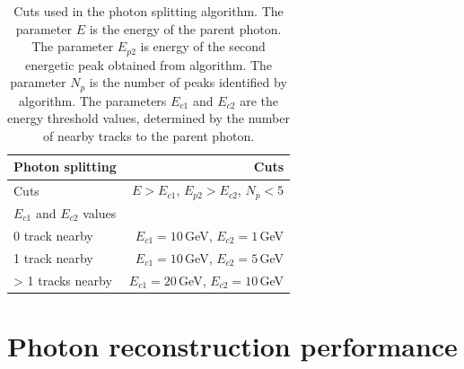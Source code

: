 \begin{table}[htbp]
\centering
\smallskip
\begin{tabular}{l r }
\hline
\hline
Photon splitting&  Cuts\\
\hline
\multicolumn{1}{L{0.3\textwidth}}{Cuts} & \multicolumn{1}{R{0.6\textwidth}}{$E > E_{c1}$, $E_{p2} > E_{c2}$, $N_{p} < 5$} \\
\hline
$E_{c1}$ and $E_{c2}$ values &  \\
\hline
\multicolumn{1}{L{0.3\textwidth}}{0 track nearby} & \multicolumn{1}{R{0.6\textwidth}}{$E_{c1} = 10$\,GeV, $E_{c2} = 1$\,GeV} \\
\multicolumn{1}{L{0.3\textwidth}}{1 track nearby} & \multicolumn{1}{R{0.6\textwidth}}{$E_{c1} = 10$\,GeV, $E_{c2} = 5$\,GeV} \\
\multicolumn{1}{L{0.3\textwidth}}{> 1 tracks nearby} & \multicolumn{1}{R{0.6\textwidth}}{$E_{c1} = 20$\,GeV, $E_{c2} = 10$\,GeV} \\
\hline
\hline
\end{tabular}

\caption[Cuts for splitting photons.]%
{Cuts used in the photon splitting algorithm. The parameter $E$ is the energy of the parent photon. The parameter $E_{p2}$ is  energy of the second energetic peak obtained from \peakFinding algorithm. The parameter $N_{p}$ is the number of peaks identified by \peakFinding algorithm. The parameters $E_{c1}$ and $E_{c2}$ are the energy threshold values, determined by the number of nearby tracks to the parent photon.}
\label{tab:photonPhotonSplitting}
\end{table}

\section{Photon reconstruction performance}




